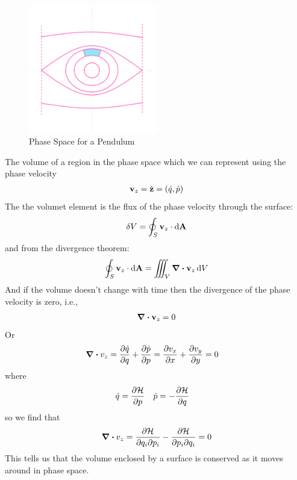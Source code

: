 \documentclass[../main.tex]{subfiles}
\begin{document}
\begin{figure}[ht]
    \centering
    \includegraphics[width=0.5\textwidth]{images/phasespace.png}
    \caption{Phase Space for a Pendulum}
    \label{fig:phase_space}
\end{figure}
The volume of a region in the phase space which we can represent using the phase velocity
\begin{align*}
    \vb v_z = \dot{\vb z} = (\dot q, \dot p)
\end{align*}
The the volumet element is the flux of the phase velocity through the surface:
\begin{align*}
    \delta V = \oint_S \vb v_z \cdot \dd{\vb A}
\end{align*}
and from the divergence theorem:
\begin{align*}
    \oint_S \vb v_z \cdot \dd{\vb A} = \iiint_V \div{\vb v_z} \dd{V}
\end{align*}
And if the volume doesn't change with time then the divergence of the phase velocity is zero, i.e.,
\begin{align*}
    \div{\vb v_z} = 0
\end{align*}
Or
\begin{align*}
    \div{v_z} &= \pdv{\dot q}{q} + \pdv{\dot p}{p} = \pdv{v_x}{x} + \pdv{v_y}{y} = 0
\end{align*}
where
\begin{align*}
    \dot q &= \pdv{\mathcal{H}}{p} \quad \dot p = -\pdv{\mathcal{H}}{q}
\end{align*}
so we find that
\begin{align*}
    \div{v_z} = \pdv{\mathcal{H}}{q_i \partial p_i} - \pdv{\mathcal{H}}{p_i \partial q_i} = 0
\end{align*}
This tells us that the volume enclosed by a surface is conserved as it moves around in phase space.
\end{document}
